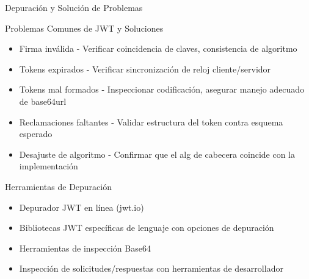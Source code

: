 \documentclass[presentation,aspectratio=169]{beamer}
\begin{document}
\begin{frame}[label={sec:org026c79c}]{Depuración y Solución de Problemas}
\begin{block}{Problemas Comunes de JWT y Soluciones}
\begin{itemize}[<+->]
\item \alert{Firma inválida} - Verificar coincidencia de claves, consistencia de algoritmo
\item \alert{Tokens expirados} - Verificar sincronización de reloj cliente/servidor
\item \alert{Tokens mal formados} - Inspeccionar codificación, asegurar manejo adecuado de base64url
\item \alert{Reclamaciones faltantes} - Validar estructura del token contra esquema esperado
\item \alert{Desajuste de algoritmo} - Confirmar que el alg de cabecera coincide con la implementación
\end{itemize}
\end{block}
\begin{block}{Herramientas de Depuración}
\begin{itemize}[<+->]
\item Depurador JWT en línea (jwt.io)
\item Bibliotecas JWT específicas de lenguaje con opciones de depuración
\item Herramientas de inspección Base64
\item Inspección de solicitudes/respuestas con herramientas de desarrollador
\end{itemize}
\end{block}
\end{frame}
\end{document}
